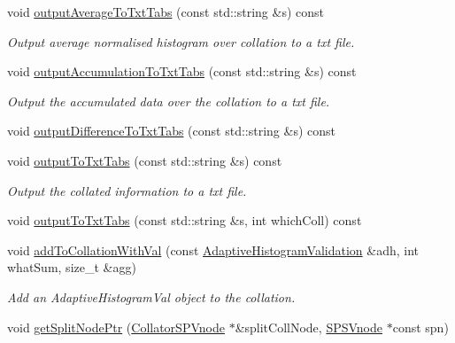 \begin{DoxyCompactItemize}
void \hyperlink{classsubpavings_1_1AdaptiveHistogramVCollator_af05a34e32911a81b2af37529994bae57}{output\-Average\-To\-Txt\-Tabs} (const std\-::string \&s) const 
\begin{DoxyCompactList}\small\item\em \-Output average normalised histogram over collation to a txt file. \end{DoxyCompactList}\item 
void \hyperlink{classsubpavings_1_1AdaptiveHistogramVCollator_a95cf6201a4b2259eb5138193affc5f6b}{output\-Accumulation\-To\-Txt\-Tabs} (const std\-::string \&s) const 
\begin{DoxyCompactList}\small\item\em \-Output the accumulated data over the collation to a txt file. \end{DoxyCompactList}\item 
void \hyperlink{classsubpavings_1_1AdaptiveHistogramVCollator_ac58c3f7d536168d4c9c8cbceb95b1908}{output\-Difference\-To\-Txt\-Tabs} (const std\-::string \&s) const 
\item 
void \hyperlink{classsubpavings_1_1AdaptiveHistogramVCollator_ad2a470a3974ad963de7debb7fe870efe}{output\-To\-Txt\-Tabs} (const std\-::string \&s) const 
\begin{DoxyCompactList}\small\item\em \-Output the collated information to a txt file. \end{DoxyCompactList}\item 
void \hyperlink{classsubpavings_1_1AdaptiveHistogramVCollator_a3a6ff433649c11815e6be5dbd04977bf}{output\-To\-Txt\-Tabs} (const std\-::string \&s, int which\-Coll) const 
\item 
void \hyperlink{classsubpavings_1_1AdaptiveHistogramVCollator_a5db65fac4ff8b3de933909f6d83f8e02}{add\-To\-Collation\-With\-Val} (const \hyperlink{classsubpavings_1_1AdaptiveHistogramValidation}{\-Adaptive\-Histogram\-Validation} \&adh, int what\-Sum, size\-\_\-t \&agg)
\begin{DoxyCompactList}\small\item\em \-Add an \-Adaptive\-Histogram\-Val object to the collation. \end{DoxyCompactList}\item 
void \hyperlink{classsubpavings_1_1AdaptiveHistogramVCollator_ab38cfd38290579694a35950af5c80c36}{get\-Split\-Node\-Ptr} (\hyperlink{classsubpavings_1_1CollatorSPVnode}{\-Collator\-S\-P\-Vnode} $\ast$\&split\-Coll\-Node, \hyperlink{classsubpavings_1_1SPSVnode}{\-S\-P\-S\-Vnode} $\ast$const spn)

\end{DoxyCompactItemize}
